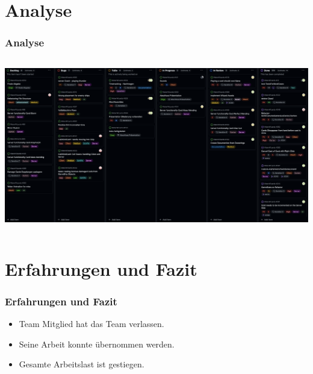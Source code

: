 \documentclass{beamer}
\begin{document}
\section{Analyse}
\begin{frame}
\frametitle{Analyse}
\begin{columns}
  \begin{column}{1\textwidth}
    \includegraphics{Kanban.png} %
  \end{column}
\end{columns}
\end{frame}

\section{Erfahrungen und Fazit}
\begin{frame}
\frametitle{Erfahrungen und Fazit}
\begin{itemize}
  \item Team Mitglied hat das Team verlassen.
  \item Seine Arbeit konnte übernommen werden.
  \item Gesamte Arbeitslast ist gestiegen. 
\end{itemize}
\end{frame}
\end{document}
